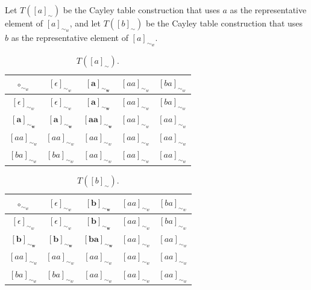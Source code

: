 \begin{proofE}
\begin{enumerate}
    Let $T([a]_{\sim})$ be the Cayley table construction that uses $a$ as the representative element of $[a]_{\sim_{w}}$, and let $T([b]_{\sim})$ be the Cayley table construction that uses $b$ as the representative element of $[a]_{\sim_{w}}$.
    \begin{table}[H]
        \centering
        \begin{tabular}{c|cccc}
            $\circ_{\sim_{w}}$              & $[\epsilon]_{\sim_{w}}$     & $\bm{[a]_{\sim_{w}}}$   & $[aa]_{\sim_{w}}$   & $[ba]_{\sim_{w}}$ \\
            \hline
            $[\epsilon]_{\sim_{w}}$        & $[\epsilon]_{\sim_{w}}$      & $\bm{[a]_{\sim_{w}}}$    & $[aa]_{\sim_{w}}$   & $[ba]_{\sim_{w}}$ \\
            $\bm{[a]_{\sim_{w}}}$          & $\bm{[a]_{\sim_{w}}}$        & $\bm{[aa]_{\sim_{w}}}$   & $[aa]_{\sim_{w}}$   & $[aa]_{\sim_{w}}$ \\
            $[aa]_{\sim_{w}}$              & $[aa]_{\sim_{w}}$            & $[aa]_{\sim_{w}}$   & $[aa]_{\sim_{w}}$   & $[aa]_{\sim_{w}}$ \\
            $[ba]_{\sim_{w}}$              & $[ba]_{\sim_{w}}$            & $[aa]_{\sim_{w}}$   & $[aa]_{\sim_{w}}$   & $[aa]_{\sim_{w}}$ \\
        \end{tabular}
        \caption{
        $T([a]_{\sim})$.
        }
    \end{table}
    \begin{table}[H]
        \centering
        \begin{tabular}{c|cccc}
            $\circ_{\sim_{w}}$              & $[\epsilon]_{\sim_{w}}$     & $\bm{[b]_{\sim_{w}}}$   & $[aa]_{\sim_{w}}$   & $[ba]_{\sim_{w}}$ \\
            \hline
            $[\epsilon]_{\sim_{w}}$        & $[\epsilon]_{\sim_{w}}$      & $\bm{[b]_{\sim_{w}}}$    & $[aa]_{\sim_{w}}$   & $[ba]_{\sim_{w}}$ \\
            $\bm{[b]_{\sim_{w}}}$          & $\bm{[b]_{\sim_{w}}}$        & $\bm{[ba]_{\sim_{w}}}$ & $[aa]_{\sim_{w}}$ & $[aa]_{\sim_{w}}$ \\
            $[aa]_{\sim_{w}}$              & $[aa]_{\sim_{w}}$            & $[aa]_{\sim_{w}}$   & $[aa]_{\sim_{w}}$   & $[aa]_{\sim_{w}}$ \\
            $[ba]_{\sim_{w}}$              & $[ba]_{\sim_{w}}$            & $[aa]_{\sim_{w}}$   & $[aa]_{\sim_{w}}$   & $[aa]_{\sim_{w}}$ \\
        \end{tabular}
        \caption{
        $T([b]_{\sim})$.
        }
    \end{table}
    

\end{enumerate}
\end{proofE}
